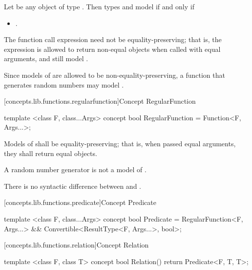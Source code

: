 \begin{addedblock}
\begin{itemdescr}
\pnum
Let  be any object of type . Then types  and  model
 if and only if

\begin{itemize}
\item {}.
\end{itemize}

\pnum
The function call expression need not be equality-preserving; that is, the expression
 is allowed to return non-equal objects when called with equal arguments,
and still model .

\pnum
\enternote Since models of  are allowed to be non-equality-preserving, a
function that generates random numbers may model .\exitnote
\end{itemdescr}

[concepts.lib.functions.regularfunction]{Concept RegularFunction}

%
\begin{itemdecl}
template <class F, class...Args>
concept bool RegularFunction =
  Function<F, Args...>;
\end{itemdecl}

\begin{itemdescr}
\pnum
Models of  shall be equality-preserving; that is, when passed
equal arguments, they shall return equal objects.

\pnum
\enternote A random number generator is not a model of .\exitnote

\pnum
\enternote There is no syntactic difference between  and
.\exitnote
\end{itemdescr}

[concepts.lib.functions.predicate]{Concept Predicate}

%
\begin{itemdecl}
template <class F, class...Args>
concept bool Predicate =
  RegularFunction<F, Args...> &&
  Convertible<ResultType<F, Args...>, bool>;
\end{itemdecl}

[concepts.lib.functions.relation]{Concept Relation}

%
\begin{itemdecl}
template <class F, class T>
concept bool Relation() {
  return Predicate<F, T, T>;
}


\end{itemdecl}
\end{addedblock}
